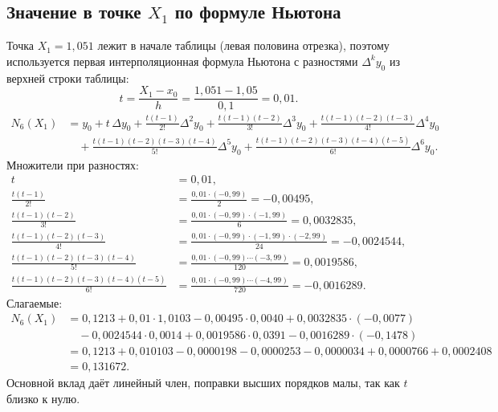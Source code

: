 \documentclass[12pt,a4paper]{article}
\begin{document}
\subsection*{Значение в точке $X_1$ по формуле Ньютона}
Точка $X_1=1{,}051$ лежит в начале таблицы (левая половина отрезка), поэтому используется первая интерполяционная формула Ньютона с разностями $\Delta^ky_0$ из верхней строки таблицы:
\[
    t=\frac{X_1-x_0}{h}=\frac{1{,}051-1{,}05}{0{,}1}=0{,}01 .
\]
\[
\begin{aligned}
    N_6(X_1)&=y_0+t\,\Delta y_0+\frac{t(t-1)}{2!}\Delta^2y_0+\frac{t(t-1)(t-2)}{3!}\Delta^3y_0+\frac{t(t-1)(t-2)(t-3)}{4!}\Delta^4y_0\\
    &\quad+\frac{t(t-1)(t-2)(t-3)(t-4)}{5!}\Delta^5y_0+\frac{t(t-1)(t-2)(t-3)(t-4)(t-5)}{6!}\Delta^6y_0 .
\end{aligned}
\]
Множители при разностях:
\[
\begin{aligned}
    t&=0{,}01,\\
    \frac{t(t-1)}{2!}&=\frac{0{,}01\cdot(-0{,}99)}{2}=-0{,}00495,\\
    \frac{t(t-1)(t-2)}{3!}&=\frac{0{,}01\cdot(-0{,}99)\cdot(-1{,}99)}{6}=0{,}0032835,\\
    \frac{t(t-1)(t-2)(t-3)}{4!}&=\frac{0{,}01\cdot(-0{,}99)\cdot(-1{,}99)\cdot(-2{,}99)}{24}=-0{,}0024544,\\
    \frac{t(t-1)(t-2)(t-3)(t-4)}{5!}&=\frac{0{,}01\cdot(-0{,}99)\cdots(-3{,}99)}{120}=0{,}0019586,\\
    \frac{t(t-1)(t-2)(t-3)(t-4)(t-5)}{6!}&=\frac{0{,}01\cdot(-0{,}99)\cdots(-4{,}99)}{720}=-0{,}0016289 .
\end{aligned}
\]
Слагаемые:
\[
\begin{aligned}
    N_6(X_1)&=0{,}1213+0{,}01\cdot1{,}0103-0{,}00495\cdot0{,}0040+0{,}0032835\cdot(-0{,}0077)\\
    &\quad-0{,}0024544\cdot0{,}0014+0{,}0019586\cdot0{,}0391-0{,}0016289\cdot(-0{,}1478)\\
    &=0{,}1213+0{,}010103-0{,}0000198-0{,}0000253-0{,}0000034+0{,}0000766+0{,}0002408\\
    &=0{,}131672 .
\end{aligned}
\]
Основной вклад даёт линейный член, поправки высших порядков малы, так как $t$ близко к нулю.
\end{document}
